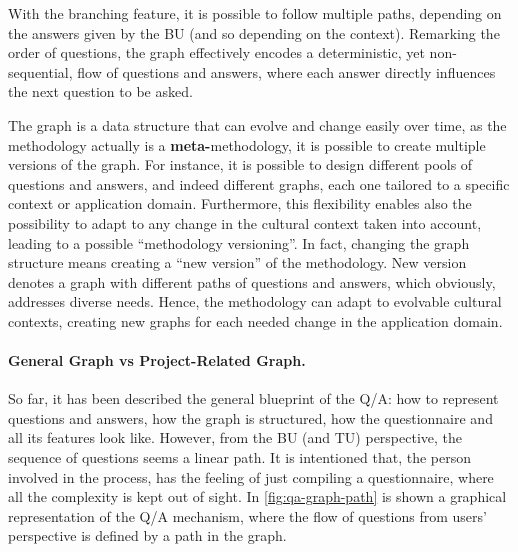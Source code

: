 \documentclass[12pt,a4paper,openright,twoside]{book}
\begin{document}
With the branching feature, it is possible to follow multiple paths, depending on the answers given by the \acf{BU} (and so depending on the context).
%
Remarking the order of questions, the graph effectively encodes a deterministic, yet non-sequential, flow of questions and answers, where each answer directly influences the next question to be asked.

The graph is a data structure that can evolve and change easily over time, as the methodology actually is a \textbf{meta-}methodology, it is possible to create multiple versions of the graph.
%
For instance, it is possible to design different pools of questions and answers, and indeed different graphs, each one tailored to a specific context or application domain.
%
Furthermore, this flexibility enables also the possibility to adapt to any change in the cultural context taken into account, leading to a possible ``methodology versioning''.
%
In fact, changing the graph structure means creating a ``new version'' of the methodology.
%
New version denotes a graph with different paths of questions and answers, which obviously, addresses diverse needs.
%
Hence, the methodology can adapt to evolvable cultural contexts, creating new graphs for each needed change in the application domain.

\paragraph{General Graph vs Project-Related Graph.}
So far, it has been described the general blueprint of the \ac{Q/A}: how to represent questions and answers, how the graph is structured, how the questionnaire and all its features look like.
%
However, from the \acl{BU} (and \acl{TU}) perspective, the sequence of questions seems a linear path.
%
It is intentioned that, the person involved in the process, has the feeling of just compiling a questionnaire, where all the complexity is kept out of sight.
%
In \cref{fig:qa-graph-path} is shown a graphical representation of the \ac{Q/A} mechanism, where the flow of questions from users' perspective is defined by a path in the graph.
\end{document}
